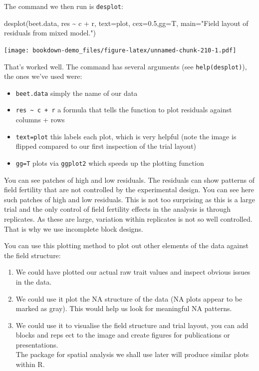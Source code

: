 \documentclass[
]{book}
\newenvironment{Shaded}{\begin{snugshade}}{\end{snugshade}}
\newcommand{\AttributeTok}[1]{\textcolor[rgb]{0.77,0.63,0.00}{#1}}
\newcommand{\FloatTok}[1]{\textcolor[rgb]{0.00,0.00,0.81}{#1}}
\newcommand{\FunctionTok}[1]{\textcolor[rgb]{0.00,0.00,0.00}{#1}}
\newcommand{\NormalTok}[1]{#1}
\newcommand{\SpecialCharTok}[1]{\textcolor[rgb]{0.00,0.00,0.00}{#1}}
\newcommand{\StringTok}[1]{\textcolor[rgb]{0.31,0.60,0.02}{#1}}
\providecommand{\tightlist}{%
  \setlength{\itemsep}{0pt}\setlength{\parskip}{0pt}}
\begin{document}
The command we then run is \texttt{desplot}:

\begin{Shaded}
\begin{Highlighting}[]
\FunctionTok{desplot}\NormalTok{(beet.data, res }\SpecialCharTok{\textasciitilde{}}\NormalTok{ c }\SpecialCharTok{+}\NormalTok{ r, }\AttributeTok{text=}\NormalTok{plot, }\AttributeTok{cex=}\FloatTok{0.5}\NormalTok{,}\AttributeTok{gg=}\NormalTok{T,}
        \AttributeTok{main=}\StringTok{"Field layout of residuals from mixed model."}\NormalTok{)}
\end{Highlighting}
\end{Shaded}

\texttt{[image: bookdown-demo\_files/figure-latex/unnamed-chunk-210-1.pdf]}

That's worked well. The command has several arguments (see \texttt{help(desplot)}), the ones we've used were:

\begin{itemize}
\tightlist
\item
  \texttt{beet.data} simply the name of our data
\item
  \texttt{res\ \textasciitilde{}\ c\ +\ r} a formula that tells the function to plot residuals against columns + rows
\item
  \texttt{text=plot} this labels each plot, which is very helpful (note the image is flipped compared to our first inspection of the trial layout)
\item
  \texttt{gg=T} plots via \texttt{ggplot2} which speeds up the plotting function
\end{itemize}

You can see patches of high and low residuals. The residuals can show patterns of field fertility that are not controlled by the experimental design. You can see here such patches of high and low residuals. This is not too surprising as this is a large trial and the only control of field fertility effects in the analysis is through replicates. As these are large, variation within replicates is not so well controlled. That is why we use incomplete block designs.

You can use this plotting method to plot out other elements of the data against the field structure:

\begin{enumerate}
\def\labelenumi{\arabic{enumi}.}
\tightlist
\item
  We could have plotted our actual raw trait values and inspect obvious issues in the data.
\item
  We could use it plot the NA structure of the data (NA plots appear to be marked as gray). This would help us look for meaningful NA patterns.
\item
  We could use it to visualise the field structure and trial layout, you can add blocks and reps ect to the image and create figures for publications or presentations.\\
  The package for spatial analysis we shall use later will produce similar plots within R.
\end{enumerate}
\end{document}
